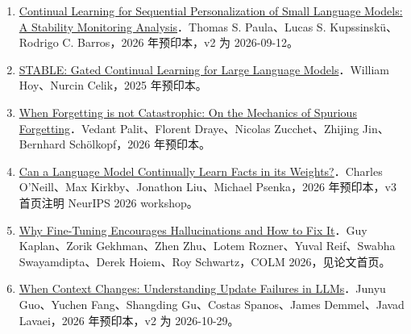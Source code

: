 \documentclass[UTF8,fontset=fandol,10pt,a4paper]{ctexart}
\begin{document}
\begin{enumerate}
\item
\href{https://arxiv.org/abs/2606.27634}{Continual Learning for Sequential Personalization of Small Language Models: A Stability Monitoring Analysis}．Thomas S. Paula、Lucas S. Kupssinskü、Rodrigo C. Barros，2026 年预印本，v2 为 2026-09-12。



\item
\href{https://arxiv.org/abs/2510.16089}{STABLE: Gated Continual Learning for Large Language Models}．William Hoy、Nurcin Celik，2025 年预印本。



\item
\href{https://arxiv.org/abs/2610.08718}{When Forgetting is not Catastrophic: On the Mechanics of Spurious Forgetting}．Vedant Palit、Florent Draye、Nicolas Zucchet、Zhijing Jin、Bernhard Schölkopf，2026 年预印本。



\item
\href{https://www.alphaxiv.org/abs/2607.11020.md}{Can a Language Model Continually Learn Facts in its Weights?}．Charles O’Neill、Max Kirkby、Jonathon Liu、Michael Psenka，2026 年预印本，v3 首页注明 NeurIPS 2026 workshop。



\item
\href{https://arxiv.org/pdf/2604.15574}{Why Fine-Tuning Encourages Hallucinations and How to Fix It}．Guy Kaplan、Zorik Gekhman、Zhen Zhu、Lotem Rozner、Yuval Reif、Swabha Swayamdipta、Derek Hoiem、Roy Schwartz，COLM 2026，见论文首页。



\item
\href{https://arxiv.org/pdf/2609.38866}{When Context Changes: Understanding Update Failures in LLMs}．Junyu Guo、Yuchen Fang、Shangding Gu、Costas Spanos、James Demmel、Javad Lavaei，2026 年预印本，v2 为 2026-10-29。



\end{enumerate}
\end{document}

